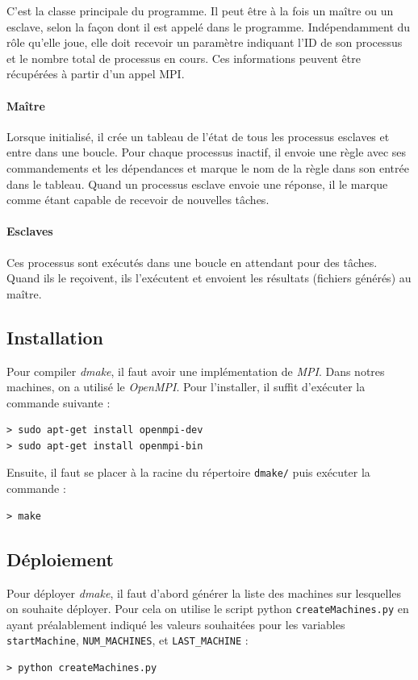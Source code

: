 \documentclass[a4paper,12pt,twoside]{article}
\begin{document}
C'est la classe principale du programme. Il peut être à la fois un maître ou un esclave, selon la façon dont il est appelé dans le programme. Indépendamment du rôle qu'elle joue, elle doit recevoir un paramètre indiquant l'ID de son processus et le nombre total de processus en cours. Ces informations peuvent être récupérées à partir d'un appel MPI.

\paragraph{Maître}

Lorsque initialisé, il crée un tableau de l'état de tous les processus esclaves et entre dans une boucle. Pour chaque processus inactif, il envoie une règle avec ses commandements et les dépendances et marque le nom de la règle dans son entrée dans le tableau. Quand un processus esclave envoie une réponse, il le marque comme étant capable de recevoir de nouvelles tâches.

\paragraph{Esclaves}

Ces processus sont exécutés dans une boucle en attendant pour des tâches. Quand ils le reçoivent, ils l'exécutent et envoient les résultats (fichiers générés) au maître.

\subsection{Installation}

Pour compiler \emph{dmake}, il faut avoir une implémentation de \emph{MPI}.
Dans notres machines, on a utilisé le \emph{OpenMPI}. Pour l'installer, il
suffit d'exécuter la commande suivante :
\begin{verbatim}
> sudo apt-get install openmpi-dev
> sudo apt-get install openmpi-bin
\end{verbatim}

Ensuite, il faut se placer à la racine du
répertoire \texttt{dmake/} puis exécuter la commande :
\begin{verbatim}
> make
\end{verbatim}

\subsection{Déploiement}

Pour déployer \emph{dmake}, il faut d'abord générer la liste des
machines sur lesquelles on souhaite déployer. Pour cela on utilise le
script python \texttt{createMachines.py} en ayant préalablement indiqué
les valeurs souhaitées pour les variables \texttt{startMachine},
\texttt{NUM\_MACHINES}, et \texttt{LAST\_MACHINE} : 
\begin{verbatim}
> python createMachines.py
\end{verbatim}
\end{document}
